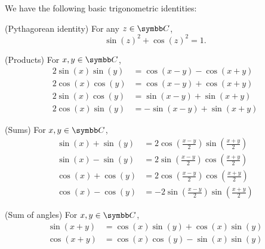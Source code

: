 \begin{proposition}\label{thm:trigonometric_identities}
  We have the following basic trigonometric identities:
  \begin{PropEnum}
     (Pythagorean identity) For any \( z \in \BC \),
    \begin{equation}\label{eq:thm:trigonometric_function_properties/pythagorean_identity}
      \sin(z)^2 + \cos(z)^2 = 1.
    \end{equation}

     (Products) For \( x, y \in \BC \),
    \begin{align}
      2 \sin(x) \sin(y) & = \cos(x - y) - \cos(x + y) \label{eq:thm:trigonometric_identities/products/ss}  \\
      2 \cos(x) \cos(y) & = \cos(x - y) + \cos(x + y) \label{eq:thm:trigonometric_identities/products/cc}  \\
      2 \sin(x) \cos(y) & = \sin(x - y) + \sin(x + y) \label{eq:thm:trigonometric_identities/products/sc}  \\
      2 \cos(x) \sin(y) & = -\sin(x - y) + \sin(x + y) \label{eq:thm:trigonometric_identities/products/cs}
    \end{align}

     (Sums) For \( x, y \in \BC \),
    \begin{align}
      \sin(x) + \sin(y) & = 2 \cos\left(\frac{x - y} 2 \right) \sin\left(\frac{x + y} 2 \right) \label{eq:thm:trigonometric_identities/sums/sin_sum}   \\
      \sin(x) - \sin(y) & = 2 \sin\left(\frac{x - y} 2 \right) \cos\left(\frac{x + y} 2 \right) \label{eq:thm:trigonometric_identities/sums/sin_diff}  \\
      \cos(x) + \cos(y) & = 2 \cos\left(\frac{x - y} 2 \right) \cos\left(\frac{x + y} 2 \right) \label{eq:thm:trigonometric_identities/sums/cos_sum}   \\
      \cos(x) - \cos(y) & = -2 \sin\left(\frac{x - y} 2 \right) \sin\left(\frac{x + y} 2 \right) \label{eq:thm:trigonometric_identities/sums/cos_diff}
    \end{align}

     (Sum of angles) For \( x, y \in \BC \),
    \begin{align}
      \sin(x + y) & = \cos(x) \sin(y) + \cos(x) \sin(y) \label{eq:thm:trigonometric_identities/sum_of_angles/sin} \\
      \cos(x + y) & = \cos(x) \cos(y) - \sin(x) \sin(y) \label{eq:thm:trigonometric_identities/sum_of_angles/cos}
    \end{align}
  \end{PropEnum}
\end{proposition}
